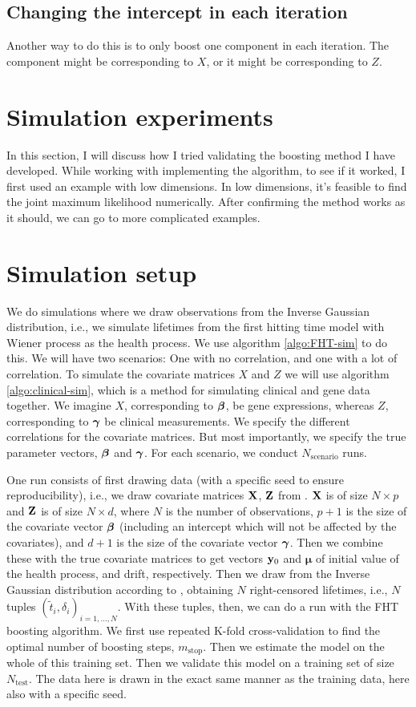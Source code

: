 \subsection{Changing the intercept in each iteration}
Another way to do this is to only boost one component in each iteration. The component might be corresponding to $X$, or it might be corresponding to $Z$.


\section{Simulation experiments}
In this section, I will discuss how I tried validating the boosting method I have developed. While working with implementing the algorithm, to see if it worked, I first used an example with low dimensions. In low dimensions, it's feasible to find the joint maximum likelihood numerically. After confirming the method works as it should, we can go to more complicated examples.

\section{Simulation setup}
We do simulations where we draw observations from the Inverse Gaussian distribution, i.e., we simulate lifetimes from the first hitting time model with Wiener process as the health process. We use algorithm \eqref{algo:FHT-sim} to do this. We will have two scenarios: One with no correlation, and one with a lot of correlation. To simulate the covariate matrices $X$ and $Z$ we will use algorithm \eqref{algo:clinical-sim}, which is a method for simulating clinical and gene data together. We imagine $X$, corresponding to $\boldsymbol{\beta}$, be gene expressions, whereas $Z$, corresponding to $\boldsymbol{\gamma}$ be clinical measurements. We specify the different correlations for the covariate matrices. But most importantly, we specify the true parameter vectors, $\boldsymbol{\beta}$ and $\boldsymbol{\gamma}$. For each scenario, we conduct $N_{\text{scenario}}$ runs.

One run consists of first drawing data (with a specific seed to ensure reproducibility), i.e., we draw covariate matrices $\mathbf{X}$, $\mathbf{Z}$ from \label{algo:clinical-sim}. $\mathbf{X}$ is of size $N\times p$ and $\mathbf{Z}$ is of size $N\times d$, where $N$ is the number of observations, $p+1$ is the size of the covariate vector $\boldsymbol{\beta}$ (including an intercept which will not be affected by the covariates), and $d+1$ is the size of the covariate vector $\boldsymbol{\gamma}$. Then we combine these with the true covariate matrices to get vectors $\mathbf{y}_0$ and $\mathbf{\mu}$ of initial value of the health process, and drift, respectively. Then we draw from the Inverse Gaussian distribution according to \label{algo:FHT-sim}, obtaining $N$ right-censored lifetimes, i.e., $N$ tuples $(\widetilde{t}_i,\delta_i)_{i=1,\ldots,N}$. With these tuples, then, we can do a run with the FHT boosting algorithm. We first use repeated K-fold cross-validation to find the optimal number of boosting steps, $m_{\text{stop}}$. Then we estimate the model on the whole of this training set. Then we validate this model on a training set of size $N_{\text{test}}$. The data here is drawn in the exact same manner as the training data, here also with a specific seed.

